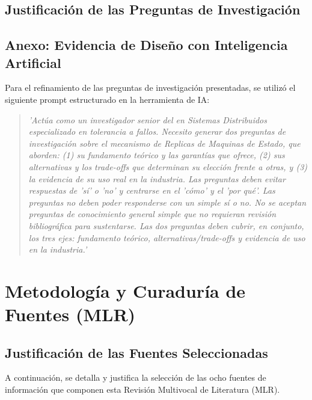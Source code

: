 \documentclass[12pt,letterpaper]{article}
\begin{document}
\subsection{Justificación de las Preguntas de Investigación}

\subsection{Anexo: Evidencia de Diseño con Inteligencia Artificial}
Para el refinamiento de las preguntas de investigación presentadas, se utilizó el siguiente prompt estructurado en la herramienta de IA:

\begin{quote}
    \small\itshape
    'Actúa como un investigador senior del en Sistemas Distribuidos especializado en tolerancia a fallos. Necesito generar dos preguntas de investigación sobre el mecanismo de Replicas de Maquinas de Estado, que aborden: (1) su fundamento teórico y las garantías que ofrece, (2) sus alternativas y los trade-offs que determinan su elección frente a otras, y (3) la evidencia de su uso real en la industria. Las preguntas deben evitar respuestas de 'sí' o 'no' y centrarse en el 'cómo' y el 'por qué'.
    Las preguntas no deben poder responderse con un simple sí o no.
    No se aceptan preguntas de conocimiento general simple que no requieran revisión bibliográfica para sustentarse.
    Las dos preguntas deben cubrir, en conjunto, los tres ejes: fundamento teórico, alternativas/trade-offs y evidencia de uso en la industria.'
\end{quote}


\section{Metodología y Curaduría de Fuentes (MLR)}
\label{sec:metodologia}

\subsection{Justificación de las Fuentes Seleccionadas}
A continuación, se detalla y justifica la selección de las ocho fuentes de información que componen esta Revisión Multivocal de Literatura (MLR).
\end{document}
